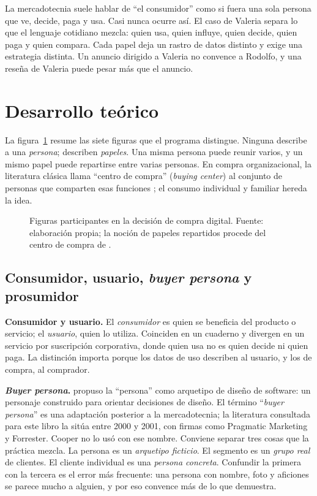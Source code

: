 La mercadotecnia suele hablar de \enquote{el consumidor} como si fuera una
sola persona que ve, decide, paga y usa. Casi nunca ocurre así. El caso de
Valeria separa lo que el lenguaje cotidiano mezcla: quien usa, quien influye,
quien decide, quien paga y quien compara. Cada papel deja un rastro de datos
distinto y exige una estrategia distinta. Un anuncio dirigido a Valeria no
convence a Rodolfo, y una reseña de Valeria puede pesar más que el anuncio.

\section{Desarrollo teórico}

La figura~\ref{fig:cap08-roles} resume las siete figuras que el programa
distingue. Ninguna describe a una \emph{persona}; describen \emph{papeles}. Una
misma persona puede reunir varios, y un mismo papel puede repartirse entre
varias personas. En compra organizacional, la literatura clásica llama
\enquote{centro de compra} (\textit{buying center}) al conjunto de personas
que comparten esas funciones \parencite{webster1972}; el consumo individual y
familiar hereda la idea.

\begin{figure}[!htb]
  \centering
  \resizebox{0.95\textwidth}{!}{}
  \caption{Figuras participantes en la decisión de compra digital. Fuente:
  elaboración propia; la noción de papeles repartidos procede del centro de
  compra de \textcite{webster1972}.}
  \label{fig:cap08-roles}
\end{figure}

\subsection{Consumidor, usuario, \textit{buyer persona} y prosumidor}
\label{sec:cap08-persona}

\textbf{Consumidor y usuario.} El \emph{consumidor} es quien se beneficia del
producto o servicio; el \emph{usuario}, quien lo utiliza. Coinciden en un
cuaderno y divergen en un servicio por suscripción corporativa, donde quien usa
no es quien decide ni quien paga. La distinción importa porque los datos de
uso describen al usuario, y los de compra, al comprador.

\textbf{\textit{Buyer persona}.} \textcite{cooper1999inmates} propuso la
\enquote{persona} como arquetipo de diseño de software: un personaje
construido para orientar decisiones de diseño. El término \enquote{\textit{buyer
persona}} es una adaptación posterior a la mercadotecnia; la literatura
consultada para este libro la sitúa entre 2000 y 2001, con firmas como
Pragmatic Marketing y Forrester. Cooper no lo usó con ese nombre. Conviene
separar tres cosas que la práctica mezcla. La persona es un
\emph{arquetipo ficticio}. El segmento es un \emph{grupo real} de clientes. El
cliente individual es una \emph{persona concreta}. Confundir la primera con
la tercera es el error más frecuente: una persona con nombre, foto y
aficiones se parece mucho a alguien, y por eso convence más de lo que
demuestra.

